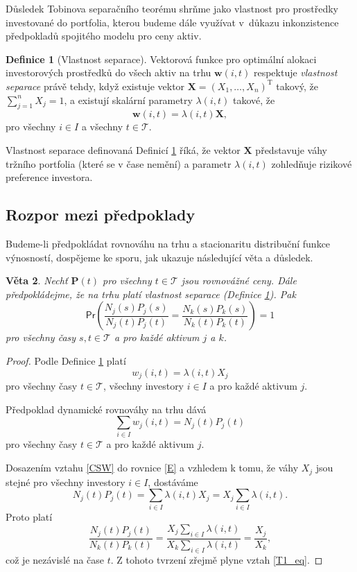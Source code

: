 \documentclass[a4paper,12pt]{report}
\newtheorem{veta}{Věta}
\theoremstyle{definition} \newtheorem{definice}[veta]{Definice}
\theoremstyle{remark}
\begin{document}
Důsledek Tobinova separačního teorému shrňme jako vlastnost pro prostředky investované do portfolia, kterou budeme dále využívat v~důkazu inkonzistence předpokladů spojitého modelu pro ceny aktiv.
\begin{definice}[Vlastnost separace]\label{vlastnost_separace}
Vektorová funkce pro optimální alokaci investorových prostředků do všech aktiv na trhu $\boldsymbol{w}(i,t)$ respektuje \textit{vlastnost separace} právě tehdy, když existuje vektor $\boldsymbol{X}=(X_1,\dots,X_n)^\mathrm{T}$ takový, že $\sum_{j=1}^nX_j=1$, a existují skalární parametry $\lambda(i,t)$ takové, že
$$\boldsymbol{w}(i,t)=\lambda(i,t)\boldsymbol{X},$$
pro všechny $i\in I$ a všechny $t\in \mathcal{T}$.
\end{definice}
Vlastnost separace definovaná Definicí \ref{vlastnost_separace} říká, že vektor $\boldsymbol{X}$ představuje váhy tržního portfolia (které se v čase nemění) a parametr $\lambda(i,t)$ zohledňuje rizikové preference investora.

\subsection{Rozpor mezi předpoklady}
Budeme-li předpokládat rovnováhu na trhu a stacionaritu distribuční funkce výnosností, dospějeme ke sporu, jak ukazuje následující věta a důsledek.

\begin{veta} \label{T1}
Nechť $\boldsymbol{P}(t)$ pro všechny $t\in \mathcal{T}$  jsou rovnovážné ceny.
Dále předpokládejme, že na trhu platí vlastnost separace (Definice \ref{vlastnost_separace}).
Pak
\begin{equation}\label{T1_eq}
\mathsf{Pr}\left(\frac{N_j(s)P_j(s)}{N_j(t)P_j(t)}=\frac{N_k(s)P_k(s)}{N_k(t)P_k(t)}\right)=1
\end{equation}
pro všechny časy $s,t\in \mathcal{T}$  a pro každé aktivum $j$ a $k$.
\end{veta}

\begin{proof}
Podle Definice \ref{vlastnost_separace} platí
\begin{equation}\label{CSW}
w_j(i,t)=\lambda(i,t)X_j
\end{equation}
pro všechny časy $t\in \mathcal{T}$, všechny investory $i\in I$ a pro každé aktivum $j$.

Předpoklad dynamické rovnováhy na trhu dává
\begin{equation}\label{E}
\sum_{i\in I} w_{j}(i,t)=N_j(t)P_j(t)
\end{equation}
pro všechny časy $t\in \mathcal{T}$ a pro každé aktivum $j$.

Dosazením vztahu \eqref{CSW} do rovnice \eqref{E} a vzhledem k tomu, že váhy $X_j$ jsou stejné pro všechny investory $i\in I$, dostáváme
$$N_j(t)P_j(t)=\sum_{i\in I}\lambda(i,t)X_j=X_j\sum_{i\in I}\lambda(i,t).$$
Proto platí
$$\frac{N_j(t)P_j(t)}{N_k(t)P_k(t)}=\frac{X_j\sum_{i\in I}\lambda(i,t)}{X_k\sum_{i\in I}\lambda(i,t)}=\frac{X_j}{X_k},$$
což je nezávislé na čase $t$.         
Z tohoto tvrzení zřejmě plyne vztah \eqref{T1_eq}.
\end{proof}
\end{document}
